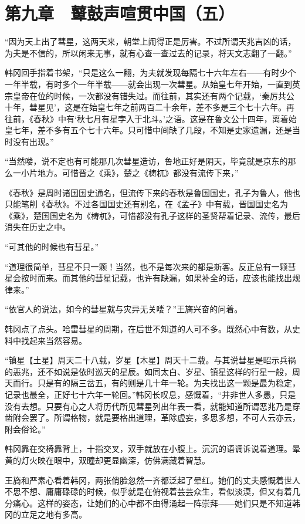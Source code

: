 \section{第九章　鼙鼓声喧贯中国（五）}

“因为天上出了彗星，这两天来，朝堂上闹得正是厉害。不过所谓天兆吉凶的话，为夫是不信的，所以闲来无事，就有心查一查过去的记录，将天文志翻了一翻。”

韩冈回手指着书架，“只是这么一翻，为夫就发现每隔七十六年左右——有时少个一年半载，有时多个一年半载——就会出现一次彗星。从始皇七年开始，一直到英宗皇帝在位的时候，一次都没有错失过。而往前，其实还有两个记载，‘秦厉共公十年，彗星见’，这是在始皇七年之前两百二十余年，差不多是三个七十六年。再往前，《春秋》中有‘秋七月有星孛入于北斗。’之语。这是在鲁文公十四年，离着始皇七年，差不多有五个七十六年。只可惜中间缺了几段，不知是史家遗漏，还是当时没有出现。”

“当然喽，说不定也有可能那几次彗星造访，鲁地正好是阴天，毕竟就是京东的那么一小片地方。可惜晋之《乘》，楚之《梼杌》都没有流传下来，”

《春秋》是周时诸国国史通名，但流传下来的春秋是鲁国国史，孔子为鲁人，他也只能笔削《春秋》。不过各国国史还有别名，在《孟子》中有载，晋国国史名为《乘》，楚国国史名为《梼杌》，可惜都没有孔子这样的圣贤帮着记录、流传，最后消失在历史之中。

“可其他的时候也有彗星。”

“道理很简单，彗星不只一颗！当然，也不是每次来的都是新客。反正总有一颗彗星会按时而来。而其他的彗星记载，也许有缺漏，如果补全的话，应该也能找出规律来。”

“依官人的说法，如今的彗星就与灾异无关喽？”王旖兴奋的问着。

韩冈点了点头。哈雷彗星的周期，在后世不知道的人可不多。既然心中有数，从史料中找起来当然容易。

“镇星【土星】周天二十八载，岁星【木星】周天十二载。与其说彗星是昭示兵祸的恶兆，还不如说是依时巡天的星辰。如同太白、岁星、镇星这样的行星一般，周天而行。只是有的隔三岔五，有的则是几十年一轮。为夫找出这一颗是最为稳定，记录也最全，正好七十六年一轮回。”韩冈长叹息，感慨着，“并非世人多愚，只是没有去想。只要有心之人将历代所见彗星列出年表一看，就能知道所谓恶兆乃是穿凿附会罢了。所谓格物，就是要格出道理，革除虚妄，多思多想，不可人云亦云，附会俗论。”

韩冈靠在交椅靠背上，十指交叉，双手就放在小腹上。沉沉的语调诉说着道理。晕黄的灯火映在眼中，双瞳却更显幽深，仿佛满藏着智慧。

王旖和严素心看着韩冈，两张俏脸忽然一齐都泛起了晕红。她们的丈夫感慨着世人不思不想、庸庸碌碌的时候，似乎就是在俯视着芸芸众生，看似淡漠，但又有着几分痛心。这样的姿态，让她们的心中都不由得涌起一阵崇拜——她们只是不知道韩冈的立足之地有多高。

